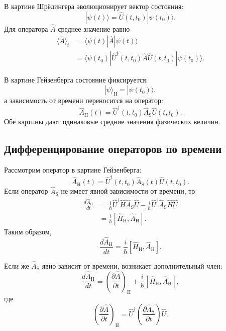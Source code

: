 \documentclass[12pt,a4paper]{article}
\begin{document}
В картине Шрёдингера эволюционирует вектор состояния:
\[
    \boxed{
        |\psi(t)\rangle
        =
        \hat U(t,t_0)|\psi(t_0)\rangle
    }.
\]
Для оператора $\hat A$ среднее значение равно
\[
\begin{aligned}
    \langle\hat A\rangle_t
    &=
    \langle\psi(t)|
        \hat A
    |\psi(t)\rangle
    \\
    &=
    \langle\psi(t_0)|
        \hat U^\dagger(t,t_0)
        \hat A
        \hat U(t,t_0)
    |\psi(t_0)\rangle.
\end{aligned}
\]

В картине Гейзенберга состояние фиксируется:
\[
    \boxed{
        |\psi\rangle_{\mathrm H}
        =
        |\psi(t_0)\rangle
    },
\]
а зависимость от времени переносится на оператор:
\[
    \boxed{
        \hat A_{\mathrm H}(t)
        =
        \hat U^\dagger(t,t_0)
        \hat A_{\mathrm S}
        \hat U(t,t_0)
    }.
\]
Обе картины дают одинаковые средние значения физических величин.


\subsection{Дифференцирование операторов по времени}

Рассмотрим оператор в картине Гейзенберга:
\[
    \hat A_{\mathrm H}(t)
    =
    \hat U^\dagger(t,t_0)
    \hat A_{\mathrm S}(t)
    \hat U(t,t_0).
\]
Если оператор $\hat A_{\mathrm S}$ не имеет явной зависимости от
времени, то
\[
\begin{aligned}
    \frac{d\hat A_{\mathrm H}}{dt}
    &=
    \frac{i}{\hbar}
    \hat U^\dagger
    \hat H
    \hat A_{\mathrm S}
    \hat U
    -
    \frac{i}{\hbar}
    \hat U^\dagger
    \hat A_{\mathrm S}
    \hat H
    \hat U
    \\
    &=
    \frac{i}{\hbar}
    \left[
        \hat H_{\mathrm H},
        \hat A_{\mathrm H}
    \right].
\end{aligned}
\]
Таким образом,
\[
    \boxed{
        \frac{d\hat A_{\mathrm H}}{dt}
        =
        \frac{i}{\hbar}
        [\hat H_{\mathrm H},\hat A_{\mathrm H}]
    }.
\]

Если же $\hat A_{\mathrm S}$ явно зависит от времени, возникает
дополнительный член:
\[
    \boxed{
    \frac{d\hat A_{\mathrm H}}{dt}
    =
    \left(
        \frac{\partial\hat A}{\partial t}
    \right)_{\mathrm H}
    +
    \frac{i}{\hbar}
    [\hat H_{\mathrm H},\hat A_{\mathrm H}]
    },
\]
где
\[
    \boxed{
    \left(
        \frac{\partial\hat A}{\partial t}
    \right)_{\mathrm H}
    =
    \hat U^\dagger
    \left(
        \frac{\partial\hat A_{\mathrm S}}{\partial t}
    \right)
    \hat U
    }.
\]
\end{document}
